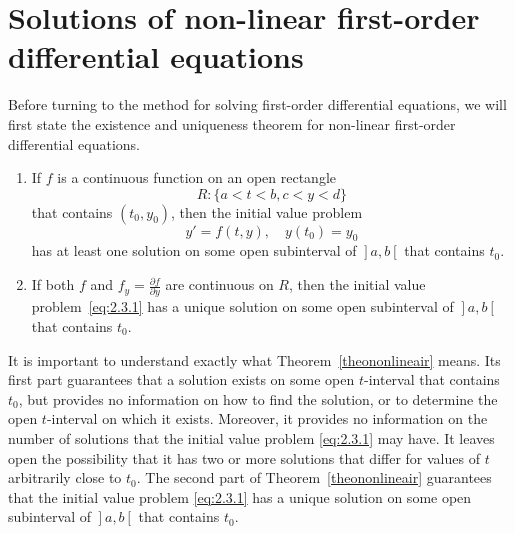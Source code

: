 \pagebreak

\section{Solutions of non-linear first-order differential equations}
Before turning to the method for solving first-order differential equations, we will first state the existence and uniqueness theorem for non-linear first-order differential equations. 

\begin{theorem}
\label{theononlineair}
\begin{enumerate}
\item If  $f$ is a continuous function on an open rectangle
$$
R:  \{ a < t < b, c < y < d \}
$$
 that contains $(t_0,y_0)$, then  the initial value problem
\begin{equation} \label{eq:2.3.1}
y'=f(t,y), \quad y(t_0)=y_0
\end{equation}
 has at least one solution  on some open subinterval of  $\left.\right]a,b\left[\right.$ that contains $t_0$. 

\item  If  both $f$ and  $f_y = \frac{\partial f}{\partial y}$ are  continuous on $R$, then the initial value problem~\eqref{eq:2.3.1} has a unique solution on some open subinterval  of $\left.\right]a,b\left[\right.$ that contains $t_0$.
\end{enumerate}
\end{theorem}


It is important to understand exactly what Theorem~\ref{theononlineair} means. Its first part guarantees that a solution exists on some open $t$-interval that contains $t_0$, but provides no information on how to find the solution, or to determine the open $t$-interval on which it exists. Moreover, it provides no information on the number of solutions that the initial value problem \eqref{eq:2.3.1} may have. It leaves open the possibility that it has two or more solutions that differ for values of $t$ arbitrarily close to $t_0$. The second part of Theorem~\ref{theononlineair} guarantees that the initial value problem \eqref{eq:2.3.1} has a unique solution on some open subinterval of $\left.\right]a,b\left[\right.$ that contains $t_0$. 

